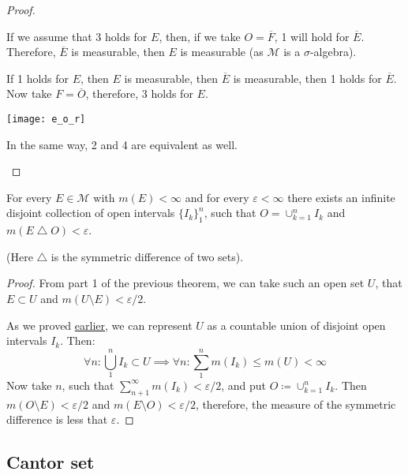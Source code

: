 \begin{proof}
\begin{itemize}
{            If we assume that 3 holds for $E$, then, if we take $O = \overline{F}$,
            1 will hold for $\overline{E}$.
            Therefore, $\overline{E}$ is measurable, then $E$ is measurable
            (as $\mathcal{M}$ is a $\sigma$-algebra).

            If 1 holds for $E$, then $E$ is measurable, then $\overline{E}$ is measurable, then 1 holds for 
            $\overline{E}$. Now take $F = \overline{O}$, therefore, 3 holds for $E$.

            \begin{figure*}[h]
                \centering
                \texttt{[image: e\_o\_r]}
            \end{figure*}

            In the same way, 2 and 4 are equivalent as well.
        }
    \end{itemize}
\end{proof}

\begin{theorem}
    For every $E \in \mathcal{M}$ with $m(E) < \infty$ and for every
    $\varepsilon < \infty$ there exists an infinite disjoint collection of open intervals
    $\{I_k\}_1^n$, such that $O = \cup_{k=1}^n I_k$ and $m(E \operatorname{\triangle} O) < \varepsilon$.

    (Here $\triangle$ is the symmetric difference of two sets).
\end{theorem}
\begin{proof}
    From part 1 of the previous theorem,
    we can take such an open set $U$, that $E \subset U$ and $m(U \setminus E) < \varepsilon / 2$. 
    
    As we proved \hyperref[prop:bIsSmallestSigmaAlgebra]{earlier}, 
    we can represent $U$ as a countable union of disjoint open intervals $I_k$. Then:
    \[
        \forall n: \bigcup_1^n I_k \subset U \implies \forall n:
        \sum_1^n m(I_k) \le m(U) < \infty
    \]
    Now take $n$, such that $\sum_{n+1}^\infty m(I_k) < \varepsilon / 2$, and put
    $O \coloneqq \cup_{k=1}^n I_k$.
    Then $m(O \setminus E) < \varepsilon / 2$ and $m(E \setminus O) < \varepsilon / 2$,
    therefore, the measure of the symmetric difference is less that $\varepsilon$.
\end{proof}

\subsection{Cantor set}

